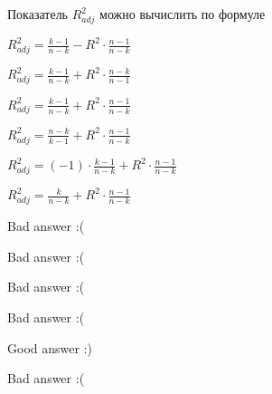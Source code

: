 
\begin{question}
Показатель \(R^2_{adj}\) можно вычислить по формуле
\begin{answerlist}
  \item \(R^2_{adj} = \frac{k-1}{n-k} - R^2 \cdot \frac{n-1}{n-k}\)
  \item \(R^2_{adj} = \frac{k-1}{n-k} + R^2 \cdot \frac{n-k}{n-1}\)
  \item \(R^2_{adj} = \frac{k-1}{n-k} + R^2 \cdot \frac{n-1}{n-k}\)
  \item \(R^2_{adj} = \frac{n-k}{k-1} + R^2 \cdot \frac{n-1}{n-k}\)
  \item \(R^2_{adj} = (-1)\cdot \frac{k-1}{n-k} + R^2 \cdot \frac{n-1}{n-k}\)
  \item \(R^2_{adj} = \frac{k}{n-k} + R^2 \cdot \frac{n-1}{n-k}\)
\end{answerlist}
\end{question}

\begin{solution}
\begin{answerlist}
  \item Bad answer :(
  \item Bad answer :(
  \item Bad answer :(
  \item Bad answer :(
  \item Good answer :)
  \item Bad answer :(
\end{answerlist}
\end{solution}

